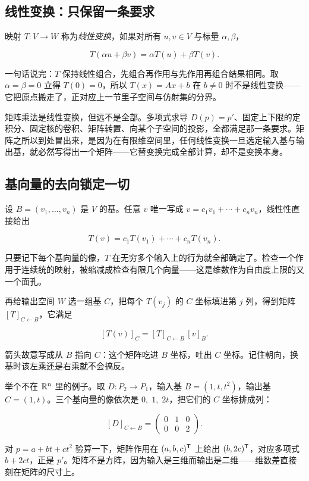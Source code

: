 \subsection{线性变换：只保留一条要求}

映射 \(T:V\to W\) 称为\emph{线性变换}，如果对所有 \(u,v\in V\) 与标量 \(\alpha,\beta\)，

\[
T(\alpha u+\beta v)=\alpha T(u)+\beta T(v).
\]

一句话说完：\(T\) 保持线性组合，先组合再作用与先作用再组合结果相同。取 \(\alpha=\beta=0\) 立得 \(T(0)=0\)，所以 \(T(x)=Ax+b\) 在 \(b\neq0\) 时不是线性变换——它把原点搬走了，正对应上一节里子空间与仿射集的分界。

矩阵乘法是线性变换，但远不是全部。多项式求导 \(D(p)=p'\)、固定上下限的定积分、固定核的卷积、矩阵转置、向某个子空间的投影，全都满足那一条要求。矩阵之所以到处冒出来，是因为在有限维空间里，任何线性变换一旦选定输入基与输出基，就必然写得出一个矩阵——它替变换完成全部计算，却不是变换本身。

\subsection{基向量的去向锁定一切}

设 \(B=(v_1,\ldots,v_n)\) 是 \(V\) 的基。任意 \(v\) 唯一写成 \(v=c_1v_1+\cdots+c_nv_n\)，线性性直接给出

\[
T(v)=c_1T(v_1)+\cdots+c_nT(v_n).
\]

只要记下每个基向量的像，\(T\) 在无穷多个输入上的行为就全部确定了。检查一个作用于连续统的映射，被缩减成检查有限几个向量——这是维数作为自由度上限的又一个面孔。

再给输出空间 \(W\) 选一组基 \(C\)，把每个 \(T(v_j)\) 的 \(C\) 坐标填进第 \(j\) 列，得到矩阵 \([T]_{C\leftarrow B}\)，它满足

\[
[T(v)]_C=[T]_{C\leftarrow B}\,[v]_B .
\]

箭头故意写成从 \(B\) 指向 \(C\)：这个矩阵吃进 \(B\) 坐标，吐出 \(C\) 坐标。记住朝向，换基时该左乘还是右乘就不会搞反。

举个不在 \(\mathbb{R}^n\) 里的例子。取 \(D:P_2\to P_1\)，输入基 \(B=(1,t,t^2)\)，输出基 \(C=(1,t)\)。三个基向量的像依次是 \(0,\;1,\;2t\)，把它们的 \(C\) 坐标排成列：

\[
[D]_{C\leftarrow B}=\begin{pmatrix}0&1&0\\0&0&2\end{pmatrix}.
\]

对 \(p=a+bt+ct^2\) 验算一下，矩阵作用在 \((a,b,c)^{\mathsf{T}}\) 上给出 \((b,2c)^{\mathsf{T}}\)，对应多项式 \(b+2ct\)，正是 \(p'\)。矩阵不是方阵，因为输入是三维而输出是二维——维数差直接刻在矩阵的尺寸上。

